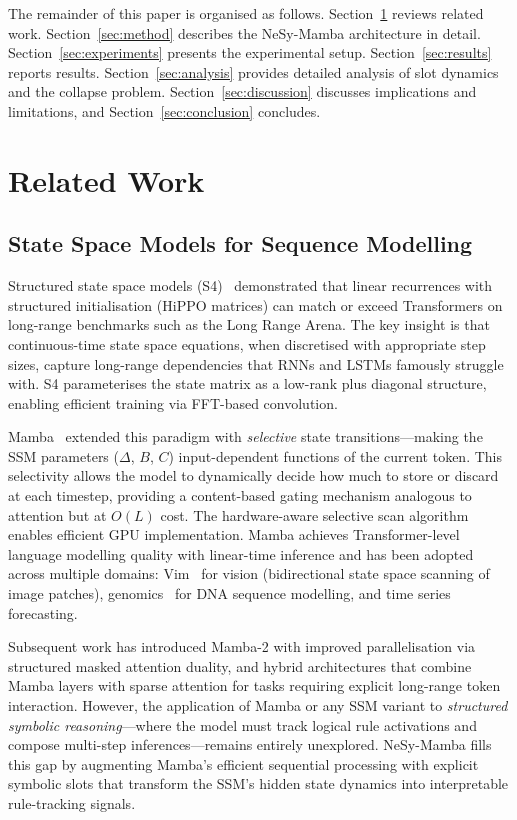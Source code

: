 \documentclass[conference]{IEEEtran}
\DeclareRobustCommand{\model}{NeSy-Mamba}
\begin{document}
The remainder of this paper is organised as follows.
Section~\ref{sec:related} reviews related work.
Section~\ref{sec:method} describes the \model{} architecture
in detail.  Section~\ref{sec:experiments} presents the
experimental setup.  Section~\ref{sec:results} reports results.
Section~\ref{sec:analysis} provides detailed analysis of slot
dynamics and the collapse problem.
Section~\ref{sec:discussion} discusses implications and
limitations, and Section~\ref{sec:conclusion} concludes.


\section{Related Work}
\label{sec:related}

\subsection{State Space Models for Sequence Modelling}

Structured state space models (S4)~\cite{gu2022s4} demonstrated
that linear recurrences with structured initialisation (HiPPO
matrices) can match or exceed Transformers on long-range
benchmarks such as the Long Range Arena.  The key insight is that
continuous-time state space equations, when discretised with
appropriate step sizes, capture long-range dependencies that RNNs
and LSTMs famously struggle with.  S4 parameterises the state
matrix as a low-rank plus diagonal structure, enabling efficient
training via FFT-based convolution.

Mamba~\cite{gu2023mamba} extended this paradigm with
\emph{selective} state transitions---making the SSM parameters
($\Delta$, $B$, $C$) input-dependent functions of the current
token.  This selectivity allows the model to dynamically decide
how much to store or discard at each timestep, providing a
content-based gating mechanism analogous to attention but at
$O(L)$ cost.  The hardware-aware selective scan algorithm enables
efficient GPU implementation.  Mamba achieves Transformer-level
language modelling quality with linear-time inference and has been
adopted across multiple domains: Vim~\cite{zhu2024vim} for vision
(bidirectional state space scanning of image patches),
genomics~\cite{gu2023mamba} for DNA sequence modelling, and time
series forecasting.

Subsequent work has introduced Mamba-2 with improved
parallelisation via structured masked attention duality, and
hybrid architectures that combine Mamba layers with sparse
attention for tasks requiring explicit long-range token
interaction.  However, the application of Mamba or any SSM variant
to \emph{structured symbolic reasoning}---where the model must
track logical rule activations and compose multi-step
inferences---remains entirely unexplored.  \model{} fills this gap
by augmenting Mamba's efficient sequential processing with explicit
symbolic slots that transform the SSM's hidden state dynamics into
interpretable rule-tracking signals.
\end{document}
